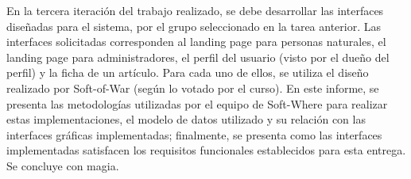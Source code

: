 En la tercera iteración del trabajo realizado, se debe desarrollar las interfaces diseñadas para el sistema, por el grupo seleccionado en la tarea anterior.
Las interfaces solicitadas corresponden al landing page para personas naturales, el landing page para administradores, el perfil del usuario (visto por el dueño del perfil) y la ficha de un artículo. Para cada uno de ellos, se utiliza el diseño realizado por Soft-of-War (según lo votado por el curso).
En este informe, se presenta las metodologías utilizadas por el equipo de Soft-Where para realizar estas implementaciones, el modelo de datos utilizado y su relación con las interfaces gráficas implementadas; finalmente, se presenta como las interfaces implementadas satisfacen los requisitos funcionales establecidos para esta entrega. 
Se concluye con magia.